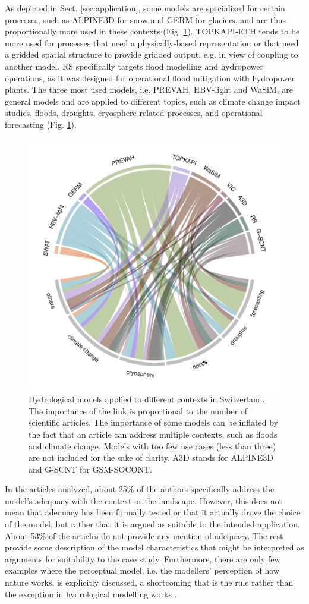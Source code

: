 \documentclass[10pt,a4paper]{article}
\begin{document}
As depicted in Sect. \ref{sec:application}, some models are specialized for certain processes, such as ALPINE3D for snow and GERM for glaciers, and are thus proportionally more used in these contexts (Fig. \ref{fig:applications}). TOPKAPI-ETH tends to be more used for processes that need a physically-based representation or that need a gridded spatial structure to provide gridded output, e.g. in view of coupling to another model. RS specifically targets flood modelling and hydropower operations, as it was designed for operational flood mitigation with hydropower plants. The three most used models, i.e. PREVAH, HBV-light and WaSiM, are general models and are applied to different topics, such as climate change impact studies, floods, droughts, cryosphere-related processes, and operational forecasting (Fig. \ref{fig:applications}).

\begin{figure}[htb]
	\begin{center}
		\includegraphics[width=0.70\columnwidth]{figures/chord_diagram_contexts}
		\caption{{Hydrological models applied to different contexts in Switzerland. The importance of the link is proportional to the number of scientific articles. The importance of some models can be inflated by the fact that an article can address multiple contexts, such as floods and climate change. Models with too few use cases (less than three) are not included for the sake of clarity. A3D stands for ALPINE3D and G-SCNT for GSM-SOCONT. 
		{\label{fig:applications}}
		}}
	\end{center}
\end{figure}

In the articles analyzed, about 25\% of the authors specifically address the model's adequacy with the context or the landscape. However, this does not mean that adequacy has been formally tested or that it actually drove the choice of the model, but rather that it is argued as suitable to the intended application. About 53\% of the articles do not provide any mention of adequacy. The rest provide some description of the model characteristics that might be interpreted as arguments for suitability to the case study. Furthermore, there are only few examples where the perceptual model, i.e. the modellers' perception of how nature works, is explicitly discussed, a shortcoming that is the rule rather than the exception in hydrological modelling works \citep{Beven2021}.
\end{document}
